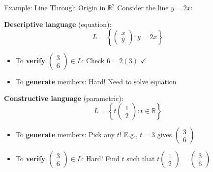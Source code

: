 \documentclass[10pt]{beamer}
\theoremstyle{definition}
\newcommand{\x}[1]{\alert{\textbf{#1}}}
\begin{document}
\begin{frame}{Example: Line Through Origin in $\mathbb{R}^2$}
Consider the line $y = 2x$:

\vfill
\textbf{Descriptive language} (equation):
$$L = \left\{ \begin{pmatrix} x \\ y \end{pmatrix} : y = 2x \right\}$$

\begin{itemize}
\item To \x{verify} $\begin{pmatrix} 3 \\ 6 \end{pmatrix} \in L$: Check $6 = 2(3)$ $\checkmark$
\item To \x{generate} members: Hard! Need to solve equation
\end{itemize}

\vfill
\textbf{Constructive language} (parametric):
$$L = \left\{ t \begin{pmatrix} 1 \\ 2 \end{pmatrix} : t \in \mathbb{R} \right\}$$

\begin{itemize}
\item To \x{generate} members: Pick any $t$! E.g., $t=3$ gives $\begin{pmatrix} 3 \\ 6 \end{pmatrix}$
\item To \x{verify} $\begin{pmatrix} 3 \\ 6 \end{pmatrix} \in L$: Hard! Find $t$ such that $t\begin{pmatrix} 1 \\ 2 \end{pmatrix} = \begin{pmatrix} 3 \\ 6 \end{pmatrix}$
\end{itemize}
\end{frame}
\end{document}
